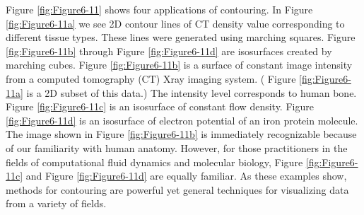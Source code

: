 Figure \ref{fig:Figure6-11} shows four applications of contouring. In Figure \ref{fig:Figure6-11a} we see 2D contour lines of CT density value corresponding to different tissue types. These lines were generated using marching squares. Figure \ref{fig:Figure6-11b} through Figure \ref{fig:Figure6-11d} are isosurfaces created by marching cubes. Figure \ref{fig:Figure6-11b} is a surface of constant image intensity from a computed tomography (CT) Xray imaging system. ( Figure \ref{fig:Figure6-11a} is a 2D subset of this data.) The intensity level corresponds to human bone. Figure \ref{fig:Figure6-11c} is an isosurface of constant flow density. Figure \ref{fig:Figure6-11d} is an isosurface of electron potential of an iron protein molecule. The image shown in Figure \ref{fig:Figure6-11b} is immediately recognizable because of our familiarity with human anatomy. However, for those practitioners in the fields of computational fluid dynamics and molecular biology, Figure \ref{fig:Figure6-11c} and Figure \ref{fig:Figure6-11d} are equally familiar. As these examples show, methods for contouring are powerful yet general techniques for visualizing data from a variety of fields.

